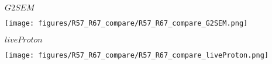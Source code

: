 \documentclass{beamer}
\begin{document}
\begin{frame}{$G2SEM$}
	\begin{center}
		\texttt{[image: figures/R57\_R67\_compare/R57\_R67\_compare\_G2SEM.png]}
	\end{center}
\end{frame}

\begin{frame}{$liveProton$}
	\begin{center}
		\texttt{[image: figures/R57\_R67\_compare/R57\_R67\_compare\_liveProton.png]}
	\end{center}
\end{frame}
\end{document}
